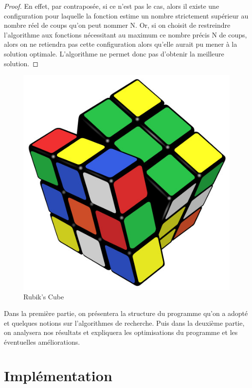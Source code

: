 \documentclass[fleqn,10pt,french]{SelfArx} %
\begin{document}
\begin{proof}
En effet, par contraposée, si ce n'est pas le cas, alors il existe une configuration pour laquelle la fonction estime un nombre strictement supérieur au nombre réel de coups qu'on peut nommer N. Or, si on choisit de restreindre l'algorithme aux fonctions nécessitant au maximum ce nombre précis N de coups, alors on ne retiendra pas cette configuration alors qu'elle aurait pu mener à la solution optimale. L'algorithme ne permet donc pas d'obtenir la meilleure solution. 
\end{proof}

\begin{figure}[h]
\centering 
\includegraphics[scale = 0.3]{RubikCube.jpg}
\caption{Rubik’s Cube}
\end{figure}

Dans la première partie, on présentera la structure du programme qu’on a adopté et quelques notions  sur l’algorithmes de recherche. Puis dans la deuxième partie, on analysera nos résultats et expliquera les optimisations du programme et les éventuelles améliorations.



\section{Implémentation}
\end{document}
